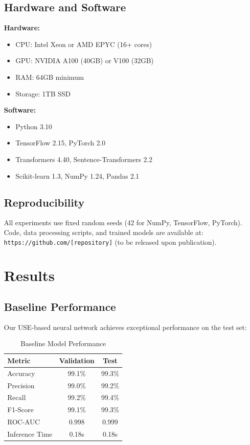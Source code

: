 \documentclass[12pt,a4paper]{article}
\begin{document}
\subsection{Hardware and Software}

\textbf{Hardware:}
\begin{itemize}
    \item CPU: Intel Xeon or AMD EPYC (16+ cores)
    \item GPU: NVIDIA A100 (40GB) or V100 (32GB)
    \item RAM: 64GB minimum
    \item Storage: 1TB SSD
\end{itemize}

\textbf{Software:}
\begin{itemize}
    \item Python 3.10
    \item TensorFlow 2.15, PyTorch 2.0
    \item Transformers 4.40, Sentence-Transformers 2.2
    \item Scikit-learn 1.3, NumPy 1.24, Pandas 2.1
\end{itemize}

\subsection{Reproducibility}

All experiments use fixed random seeds (42 for NumPy, TensorFlow, PyTorch). Code, data processing scripts, and trained models are available at: \texttt{https://github.com/[repository]} (to be released upon publication).

\section{Results}

\subsection{Baseline Performance}

Our USE-based neural network achieves exceptional performance on the test set:

\begin{table}[h]
\centering
\caption{Baseline Model Performance}
\begin{tabular}{lcc}
\toprule
\textbf{Metric} & \textbf{Validation} & \textbf{Test} \\
\midrule
Accuracy & 99.1\% & 99.3\% \\
Precision & 99.0\% & 99.2\% \\
Recall & 99.2\% & 99.4\% \\
F1-Score & 99.1\% & 99.3\% \\
ROC-AUC & 0.998 & 0.999 \\
Inference Time & 0.18s & 0.18s \\
\bottomrule
\end{tabular}
\end{table}
\end{document}

